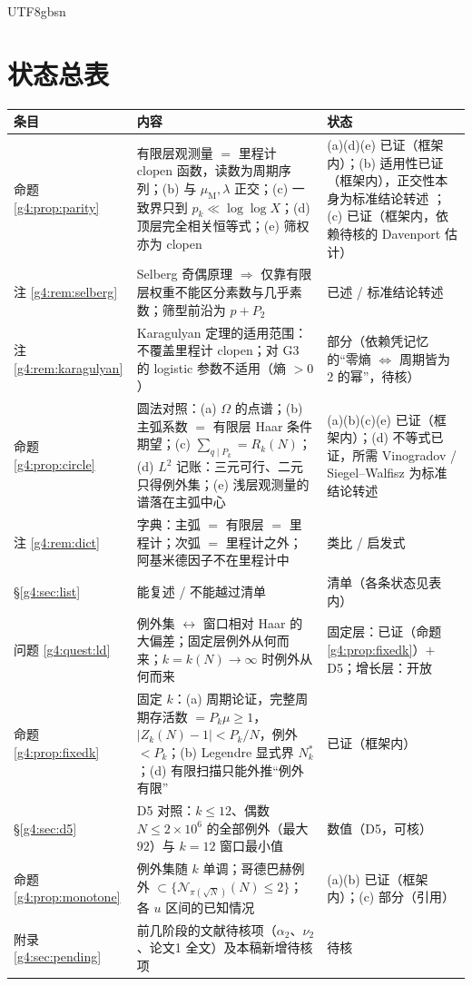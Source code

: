 \documentclass[11pt,a4paper]{article}
\newcommand{\Haar}{\mu}
\newcommand{\Cnt}{\mathcal N}          %
\newcommand{\Om}{\Omega}               %
\newcommand{\Mob}{\mu_{\mathrm{M}}}    %
\newcommand{\Liou}{\lambda}            %
\theoremstyle{plain}
\theoremstyle{definition}
\begin{document}
\begin{CJK}{UTF8}{gbsn}
\begin{abstract}
\textbf{定位声明。} 本稿\emph{不}改进陈景润定理 \cite{Chen73}，\emph{不}改进 Pintz 的例外集界 \cite{Pin18} 或任何解析例外集上界，\emph{不}对二元哥德巴赫猜想提供新证据。
其用途是把前三阶段的框架与已知障碍对齐，防止把“有限层等价”误读为“接近证明”。
\end{abstract}

\section*{状态总表}
\begin{center}
\begin{tabular}{p{2.6cm}p{7.6cm}p{4.2cm}}
\hline
条目 & 内容 & 状态\\
\hline
命题 \ref{g4:prop:parity} & 有限层观测量 $=$ 里程计 clopen 函数，读数为周期序列；(b) 与 $\Mob,\Liou$ 正交；(c) 一致界只到 $p_k\ll\log\log X$；(d) 顶层完全相关恒等式；(e) 筛权亦为 clopen & (a)(d)(e) 已证（框架内）；(b) 适用性已证（框架内），正交性本身为标准结论转述 \cite{DK15,Sar10}；(c) 已证（框架内，依赖待核的 Davenport 估计）\\
注 \ref{g4:rem:selberg} & Selberg 奇偶原理 $\Rightarrow$ 仅靠有限层权重不能区分素数与几乎素数；筛型前沿为 $p+P_2$ & 已述 / 标准结论转述\\
注 \ref{g4:rem:karagulyan} & Karagulyan 定理的适用范围：不覆盖里程计 clopen；对 G3 的 logistic 参数不适用（熵 $>0$） & 部分（依赖凭记忆的“零熵 $\iff$ 周期皆为 $2$ 的幂”，待核）\\
命题 \ref{g4:prop:circle} & 圆法对照：(a) $\Om$ 的点谱；(b) 主弧系数 $=$ 有限层 Haar 条件期望；(c) $\sum_{q\mid P_k}=R_k(N)$；(d) $L^2$ 记账：三元可行、二元只得例外集；(e) 浅层观测量的谱落在主弧中心 & (a)(b)(c)(e) 已证（框架内）；(d) 不等式已证，所需 Vinogradov / Siegel--Walfisz 为标准结论转述\\
注 \ref{g4:rem:dict} & 字典：主弧 $=$ 有限层 $=$ 里程计；次弧 $=$ 里程计之外；阿基米德因子不在里程计中 & 类比 / 启发式\\
\S\ref{g4:sec:list} & 能复述 / 不能越过清单 & 清单（各条状态见表内）\\
问题 \ref{g4:quest:ld} & 例外集 $\leftrightarrow$ 窗口相对 Haar 的大偏差；固定层例外从何而来；$k=k(N)\to\infty$ 时例外从何而来 & 固定层：已证（命题 \ref{g4:prop:fixedk}）$+$ D5；增长层：开放\\
命题 \ref{g4:prop:fixedk} & 固定 $k$：(a) 周期论证，完整周期存活数 $=P_k\Haar\ge1$，$|Z_k(N)-1|<P_k/N$，例外 $<P_k$；(b) Legendre 显式界 $N_k^*$；(d) 有限扫描只能外推“例外有限” & 已证（框架内）\\
\S\ref{g4:sec:d5} & D5 对照：$k\le12$、偶数 $N\le2\times10^6$ 的全部例外（最大 $92$）与 $k=12$ 窗口最小值 & 数值（D5，可核）\\
命题 \ref{g4:prop:monotone} & 例外集随 $k$ 单调；哥德巴赫例外 $\subset\{\Cnt_{\pi(\sqrt N)}(N)\le2\}$；各 $u$ 区间的已知情况 & (a)(b) 已证（框架内）；(c) 部分（引用）\\
附录 \ref{g4:sec:pending} & 前几阶段的文献待核项（$\alpha_2$、$\nu_2$、论文1 全文）及本稿新增待核项 & 待核\\
\hline
\end{tabular}
\end{center}


\end{CJK}
\end{document}
